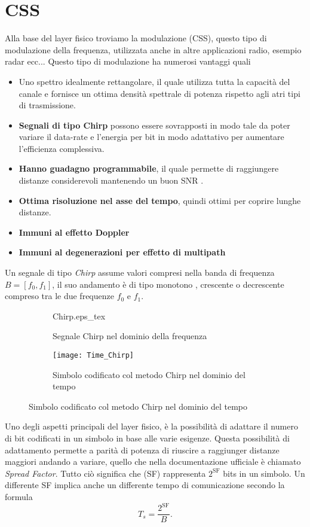 \section{CSS}
Alla base del layer fisico troviamo la modulazione (CSS), questo tipo di
modulazione della frequenza, utilizzata anche in altre applicazioni radio, 
esempio radar ecc...
Questo tipo di modulazione ha numerosi vantaggi quali 
\begin{itemize}
\item Uno spettro idealmente rettangolare, il quale utilizza tutta la capacità
del canale e fornisce un ottima densità spettrale di potenza rispetto agli atri
tipi di trasmissione.
\item \textbf{Segnali di tipo Chirp} possono essere sovrapposti in modo tale da
poter variare il data-rate e l'energia per bit in modo adattativo per aumentare
l'efficienza complessiva.
\item \textbf{Hanno guadagno programmabile}, il quale permette di raggiungere
distanze considerevoli mantenendo un buon SNR .
\item  \textbf{Ottima risoluzione nel asse del tempo}, quindi ottimi per coprire
lunghe distanze.
\item \textbf{Immuni al effetto Doppler} 
\item \textbf{Immuni al degenerazioni per effetto di multipath} 
\end{itemize}
Un segnale di tipo \emph{Chirp} assume valori compresi nella banda di frequenza
$B = [f_0,f_1]$, il suo andamento è di tipo monotono , crescente o decrescente
compreso tra le due frequenze $f_0$ e $f_1$.

\begin{figure}
\begin{subfigure}[h]{\textwidth}
\centering
{Chirp.eps_tex}
\caption{Segnale Chirp nel dominio della frequenza}
\end{subfigure}

\begin{subfigure}[h]{\textwidth}
\centering
\texttt{[image: Time\_Chirp]}
\caption{Simbolo codificato col metodo Chirp nel dominio del tempo}
\end{subfigure}
\end{figure}

Uno degli aspetti principali del layer fisico, è la possibilità di adattare il
numero di bit codificati in un simbolo in base alle varie esigenze. Questa
possibilità di adattamento permette a parità di potenza di
riuscire a raggiunger distanze maggiori andando a variare, quello che nella
documentazione ufficiale è chiamato \emph{Spread Factor}. Tutto ciò significa
che (SF) rappresenta $2^{\text{SF}}$ bits in un simbolo. Un differente SF
implica anche un differente tempo di comunicazione secondo la formula
\begin{equation}
        T_s=\frac{2^{\text{SF}}}{B}.
\end{equation}

